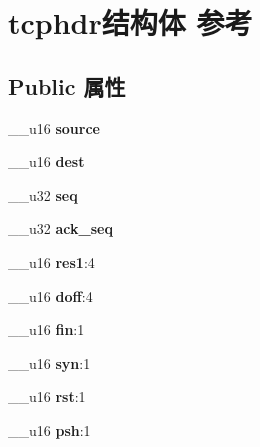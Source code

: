 \hypertarget{structtcphdr}{}\section{tcphdr结构体 参考}
\label{structtcphdr}
\subsection*{Public 属性}
\begin{DoxyCompactItemize}
\item 
\mbox{\label{structtcphdr_af322732ed13f6e8e9af1ca3fa084b839}} 
\+\_\+\+\_\+u16 {\bfseries source}
\item 
\mbox{\label{structtcphdr_a1209a5c79a8c5c71891ca7906962ab3e}} 
\+\_\+\+\_\+u16 {\bfseries dest}
\item 
\mbox{\label{structtcphdr_a37d7e753059dcc581356bae1224bf840}} 
\+\_\+\+\_\+u32 {\bfseries seq}
\item 
\mbox{\label{structtcphdr_a129366cc1550be55bb1dd6dee62899cc}} 
\+\_\+\+\_\+u32 {\bfseries ack\+\_\+seq}
\item 
\mbox{\label{structtcphdr_a74cbc36c7afdceff4c97aed85f016014}} 
\+\_\+\+\_\+u16 {\bfseries res1}\+:4
\item 
\mbox{\label{structtcphdr_ab110ade4f89596127e0be503a7655053}} 
\+\_\+\+\_\+u16 {\bfseries doff}\+:4
\item 
\mbox{\label{structtcphdr_a4dc743f212d9b5b741f2ed43958bb7dc}} 
\+\_\+\+\_\+u16 {\bfseries fin}\+:1
\item 
\mbox{\label{structtcphdr_ad72ba77096b7c6fd872699e71381fa64}} 
\+\_\+\+\_\+u16 {\bfseries syn}\+:1
\item 
\mbox{\label{structtcphdr_ae149a7b6cd9eab486c94043555ba1b74}} 
\+\_\+\+\_\+u16 {\bfseries rst}\+:1
\item 
\mbox{\label{structtcphdr_a8e080d68a84f371e51d970a013f69bda}} 
\+\_\+\+\_\+u16 {\bfseries psh}\+:1
\item 

\end{DoxyCompactItemize}
